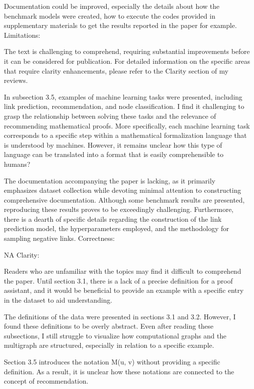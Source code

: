\documentclass{article}
\begin{document}
Documentation could be improved, especially the details about how the benchmark models were created, how to execute the codes provided in supplementary materials to get the results reported in the paper for example.
Limitations:

The text is challenging to comprehend, requiring substantial improvements before it can be considered for publication. For detailed information on the specific areas that require clarity enhancements, please refer to the Clarity section of my reviews.

In subsection 3.5, examples of machine learning tasks were presented, including link prediction, recommendation, and node classification. I find it challenging to grasp the relationship between solving these tasks and the relevance of recommending mathematical proofs. More specifically, each machine learning task corresponds to a specific step within a mathematical formalization language that is understood by machines. However, it remains unclear how this type of language can be translated into a format that is easily comprehensible to humans?

The documentation accompanying the paper is lacking, as it primarily emphasizes dataset collection while devoting minimal attention to constructing comprehensive documentation. Although some benchmark results are presented, reproducing these results proves to be exceedingly challenging. Furthermore, there is a dearth of specific details regarding the construction of the link prediction model, the hyperparameters employed, and the methodology for sampling negative links.
Correctness:

NA
Clarity:

Readers who are unfamiliar with the topics may find it difficult to comprehend the paper. Until section 3.1, there is a lack of a precise definition for a proof assistant, and it would be beneficial to provide an example with a specific entry in the dataset to aid understanding.

The definitions of the data were presented in sections 3.1 and 3.2. However, I found these definitions to be overly abstract. Even after reading these subsections, I still struggle to visualize how computational graphs and the multigraph are structured, especially in relation to a specific example.

Section 3.5 introduces the notation M(u, v) without providing a specific definition. As a result, it is unclear how these notations are connected to the concept of recommendation.
\end{document}
